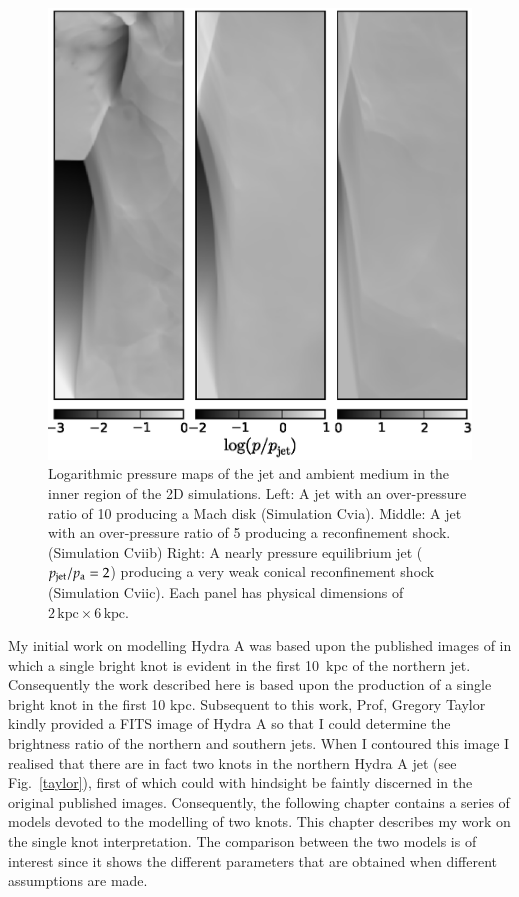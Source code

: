 \begin{figure}
\includegraphics[width=\linewidth]{pss.eps}
\caption{Logarithmic pressure maps of the jet and ambient medium in the inner region of the 2D simulations. Left: A jet with an over-pressure ratio of 10 producing a Mach disk (Simulation Cvia). Middle: A jet with an over-pressure ratio of 5 producing a reconfinement shock. (Simulation Cviib) Right: A nearly pressure equilibrium jet ($p_{\rm jet}/p_{\rm a} = 2$) producing a very weak conical reconfinement shock (Simulation Cviic). Each panel has physical dimensions of $2\,\mathrm{kpc}\times6\,\mathrm{kpc}$.}
\label{pressure_comparison}
\end{figure}


My initial work on modelling Hydra A was based upon the published images of \citep{taylor90} in which a single bright knot is evident in the first 10~kpc of the northern jet. Consequently the work described here is based upon the production of a single bright knot in the first 10 kpc. Subsequent to this work, Prof, Gregory Taylor kindly provided a FITS image of Hydra A so that I could determine the brightness ratio of the northern and southern jets. When I contoured this image I realised that there are in fact two knots in the northern Hydra A jet (see Fig.~\ref{taylor}), first of which could with hindsight be faintly discerned in the original published images. Consequently, the following chapter contains a series of models devoted to the modelling of two knots. This chapter describes my work on the single knot interpretation. The comparison between the two models is of interest since it shows the different parameters that are obtained when different assumptions are made. 

